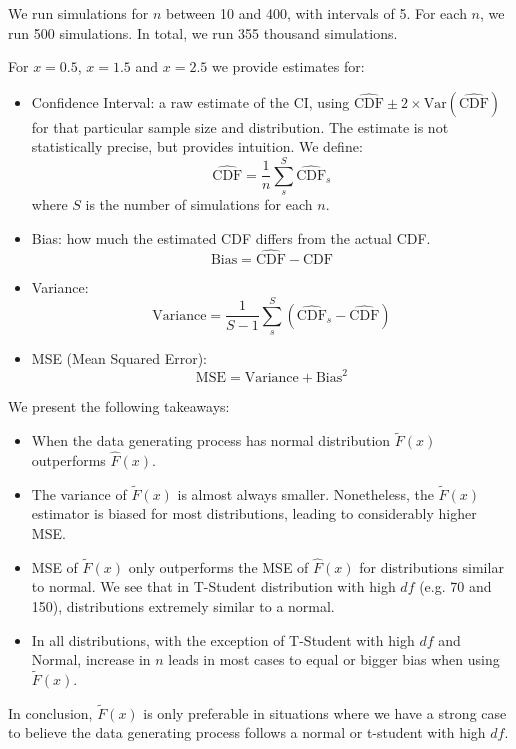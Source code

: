 \documentclass{article}
\begin{document}
We run simulations for $n$ between 10 and 400, with intervals of 5. For each $n$, we run 500 simulations. In total, we run 355 thousand simulations.

For $x = 0.5$, $x = 1.5$ and $x = 2.5$ we provide estimates for:
\begin{itemize}
  \item Confidence Interval: a raw estimate of the CI, using $\hat{\text{CDF}} \pm 2 \times \text{Var}(\hat{\text{CDF}})$ for that particular sample size and distribution. The estimate is not statistically precise, but provides intuition.
  We define:
  $$
  \hat{\text{CDF}} = \frac{1}{n} \sum_s^{S} \hat{\text{CDF}}_s
  $$
  where $S$ is the number of simulations for each $n$.
  \item Bias: how much the estimated CDF differs from the actual CDF.
  $$
  \text{Bias} = \hat{\text{CDF}} - {\text{CDF}}
  $$
  \item Variance: 
  $$
  \text{Variance} = \frac{1}{S-1} \sum_s^{S} \left(\hat{\text{CDF}}_s - \hat{\text{CDF}}\right)
  $$
  \item MSE (Mean Squared Error): 
  $$
  \text{MSE} = \text{Variance} + \text{Bias}^2
  $$
\end{itemize}

We present the following takeaways:
\begin{itemize}
  \item When the data generating process has normal distribution $\tilde{F}(x)$ outperforms $\hat{F}(x)$.
  \item The variance of $\tilde{F}(x)$ is almost always smaller. Nonetheless, the  $\tilde{F}(x)$ estimator is biased for most distributions, leading to considerably higher MSE.
  \item MSE of $\tilde{F}(x)$ only outperforms the MSE of $\hat{F}(x)$ for distributions similar to normal. We see that in T-Student distribution with high $df$ (e.g. 70 and 150), distributions extremely similar to a normal.
  \item In all distributions, with the exception of T-Student with high $df$ and Normal, increase in $n$ leads in most cases to equal or bigger bias when using $\tilde{F}(x)$.
\end{itemize}

In conclusion, $\tilde{F}(x)$ is only preferable in situations where we have a strong case to believe the data generating process follows a normal or t-student with high $df$.
\end{document}
